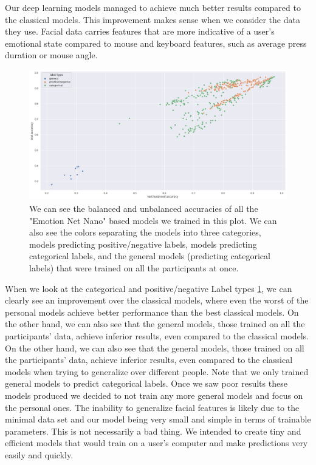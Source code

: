 \documentclass[../main.tex]{subfiles}
\begin{document}
    Our deep learning models managed to achieve much better results compared to the classical models. 
    This improvement makes sense when we consider the data they use. Facial data carries features that are more 
    indicative of a user's emotional state compared to mouse and keyboard features, such as average press duration or mouse angle.

    \begin{figure}[!htp]
        \centering
        \includegraphics[width=14cm]{figures/results/nn_acc}   
        \caption{We can see the balanced and unbalanced accuracies of all the "Emotion Net Nano" based models we trained in this plot.
        We can also see the colors separating the models into three categories, models predicting positive/negative labels, models predicting
        categorical labels, and the general models (predicting categorical labels) that were trained on all the participants at once.}
        \label{fig:nn_acc} 
    \end{figure}

    When we look at the categorical and positive/negative Label types \ref{fig:nn_acc}, we can clearly see an improvement over 
    the classical models, where even the worst of the personal models achieve better performance than the best classical models.
    On the other hand, we can also see that the general models, those trained on all the participants' data, achieve inferior results, 
    even compared to the classical models. On the other hand, we can also see that the general models, 
    those trained on all the participants' data, achieve inferior results, even compared to the classical models when trying 
    to generalize over different people. Note that we only trained general models to predict categorical labels. Once we saw poor results these models 
    produced we decided to not train any more general models and focus on the personal ones.
    The inability to generalize facial features is likely due to the minimal data set and our model being very small and simple in terms of trainable parameters. 
    This is not necessarily a bad thing. We intended to create tiny and efficient models that would train on a user's computer and make predictions very easily and quickly.
\end{document}
